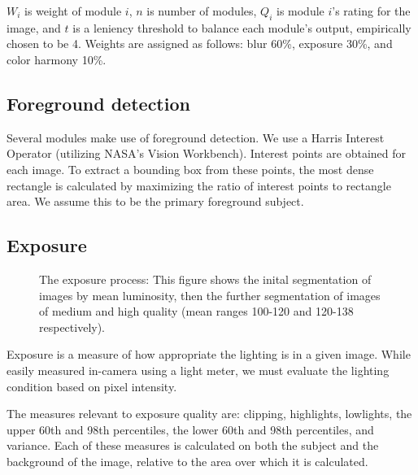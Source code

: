 \documentclass{article}
\begin{document}
\(W_i\) is weight of module \(i\), \(n\) is number of modules, \(Q_i\) is  module \(i\)'s rating for the image, and \(t\) is a leniency threshold to balance each module's output, empirically chosen to be 4. Weights are assigned as follows: blur 60\%, exposure 30\%, and color harmony 10\%.


\subsection{Foreground detection}\label{ContentRecognition}
Several modules make use of foreground detection. We use a Harris Interest Operator (utilizing NASA's Vision Workbench\cite{vision-workbench}). Interest points are obtained for each image. To extract a bounding box from these points, the most dense rectangle is calculated by maximizing the ratio of interest points to rectangle area. We assume this to be the primary foreground subject.


\subsection{Exposure}
\begin{figure}
  \centering
    \caption{The exposure process: This figure shows the inital segmentation of images by mean luminosity, then the further segmentation of images of medium and high quality (mean ranges 100-120 and 120-138 respectively).}
    \label{exposurefigure}
\end{figure}
Exposure is a measure of how appropriate the lighting is in a given image. While easily measured in-camera using a light meter, we must evaluate the lighting condition based on pixel intensity.%

The measures relevant to exposure quality are: clipping, highlights, lowlights, the upper 60th and 98th percentiles, the lower 60th and 98th percentiles, and variance. Each of these measures is calculated on both the subject and the background of the image, relative to the area over which it is calculated.
\end{document}
